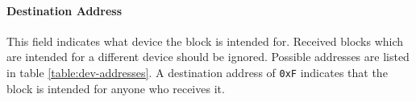 \paragraph{Destination Address}
This field indicates what device the block is intended for. Received blocks which are intended for a different device
should be ignored. Possible addresses are listed in table \ref{table:dev-addresses}. A destination address of
\lstinline{0xF} indicates that the block is intended for anyone who receives it.
